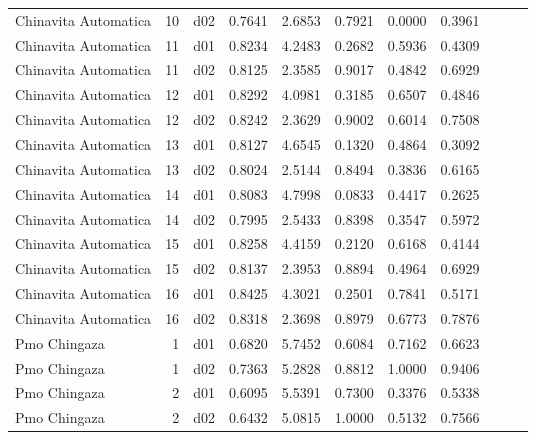 \begin{landscape}
\begin{longtable}{p{2cm}rrrrrrrrrr}
    Chinavita Automatica  &         10 &     d02 &   0.7641 &  2.6853 &        0.7921 &           0.0000 &  0.3961 \\
    Chinavita Automatica  &         11 &     d01 &   0.8234 &  4.2483 &        0.2682 &           0.5936 &  0.4309 \\
    Chinavita Automatica  &         11 &     d02 &   0.8125 &  2.3585 &        0.9017 &           0.4842 &  0.6929 \\
    Chinavita Automatica  &         12 &     d01 &   0.8292 &  4.0981 &        0.3185 &           0.6507 &  0.4846 \\
    Chinavita Automatica  &         12 &     d02 &   0.8242 &  2.3629 &        0.9002 &           0.6014 &  0.7508 \\
    Chinavita Automatica  &         13 &     d01 &   0.8127 &  4.6545 &        0.1320 &           0.4864 &  0.3092 \\
    Chinavita Automatica  &         13 &     d02 &   0.8024 &  2.5144 &        0.8494 &           0.3836 &  0.6165 \\
    Chinavita Automatica  &         14 &     d01 &   0.8083 &  4.7998 &        0.0833 &           0.4417 &  0.2625 \\
    Chinavita Automatica  &         14 &     d02 &   0.7995 &  2.5433 &        0.8398 &           0.3547 &  0.5972 \\
    Chinavita Automatica  &         15 &     d01 &   0.8258 &  4.4159 &        0.2120 &           0.6168 &  0.4144 \\
    Chinavita Automatica  &         15 &     d02 &   0.8137 &  2.3953 &        0.8894 &           0.4964 &  0.6929 \\
    Chinavita Automatica  &         16 &     d01 &   0.8425 &  4.3021 &        0.2501 &           0.7841 &  0.5171 \\
    Chinavita Automatica  &         16 &     d02 &   0.8318 &  2.3698 &        0.8979 &           0.6773 &  0.7876 \\
            Pmo Chingaza  &          1 &     d01 &   0.6820 &  5.7452 &        0.6084 &           0.7162 &  0.6623 \\
            Pmo Chingaza  &          1 &     d02 &   0.7363 &  5.2828 &        0.8812 &           1.0000 &  0.9406 \\
            Pmo Chingaza  &          2 &     d01 &   0.6095 &  5.5391 &        0.7300 &           0.3376 &  0.5338 \\
            Pmo Chingaza  &          2 &     d02 &   0.6432 &  5.0815 &        1.0000 &           0.5132 &  0.7566 \\

\end{longtable}
\end{landscape}
